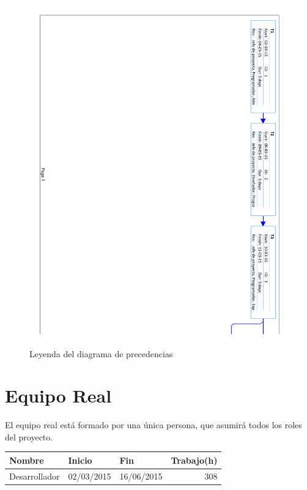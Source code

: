 \begin{figure}[!htbp]
	\centering
	\includegraphics[page=4, scale=.65]{fig/real_network_diagram}
	\caption{Leyenda del diagrama de precedencias}
\end{figure}

\FloatBarrier

\section{Equipo Real}

El equipo real está formado por una única persona, que asumirá todos los roles del proyecto.

\begin{center}
	\begin{tabular}{|l|l|l|r|}
		\hline
		Nombre & Inicio & Fin & Trabajo(h) \\ \hline
		Desarrollador & 02/03/2015 & 16/06/2015 & 308 \\
		\hline
	\end{tabular}
\end{center}

